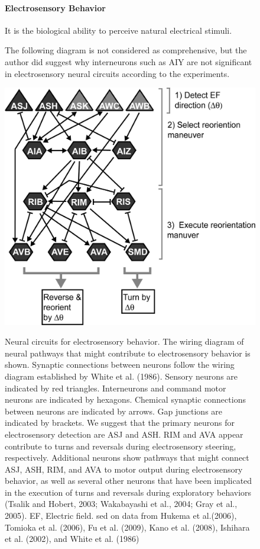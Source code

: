 \begin{figure}[H]
  \paragraph{Electrosensory Behavior \cite{gabel_neural_2007} }
  It is the biological ability to perceive natural electrical stimuli.

  The following diagram is not considered as comprehensive, but the author did suggest why interneurons such as AIY are not significant in electrosensory neural circuits
according to the experiments.

  \centering
  \includegraphics[scale=0.25]{graphics/ElectroSensoryCircuit}
  \label{fig:electro_sensory}
  \caption{Neural circuits for electrosensory behavior. The wiring diagram of neural pathways that might contribute to electrosensory behavior is shown. Synaptic connections
between neurons follow the wiring diagram established by White et al. (1986). Sensory neurons are indicated by red triangles. Interneurons and command motor neurons are
indicated by hexagons. Chemical synaptic connections between neurons are indicated by arrows. Gap junctions are indicated by brackets. We suggest that the primary
neurons for electrosensory detection are ASJ and ASH. RIM and AVA appear contribute to turns and reversals during electrosensory steering, respectively. Additional
neurons show pathways that might connect ASJ, ASH, RIM, and AVA to motor output during electrosensory behavior, as well as several other neurons that have been
implicated in the execution of turns and reversals during exploratory behaviors (Tsalik and Hobert, 2003; Wakabayashi et al., 2004; Gray et al., 2005). EF, Electric
field. sed on data from Hukema et al.(2006), Tomioka et al. (2006), Fu et al. (2009), Kano et al. (2008), Ishihara et al. (2002), and White et al. (1986)}
\end{figure}


